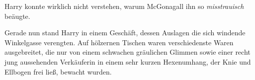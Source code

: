 Harry konnte wirklich nicht verstehen, warum McGonagall ihn so \emph{misstrauisch} beäugte.

Gerade nun stand Harry in einem Geschäft, dessen Auslagen die sich windende Winkelgasse verengten. Auf hölzernen Tischen waren verschiedenste Waren ausgebreitet, die nur von einem schwachen gräulichen Glimmen sowie einer recht jung aussehenden Verkäuferin in einem sehr kurzen Hexenumhang, der Knie und Ellbogen frei ließ, bewacht wurden.

